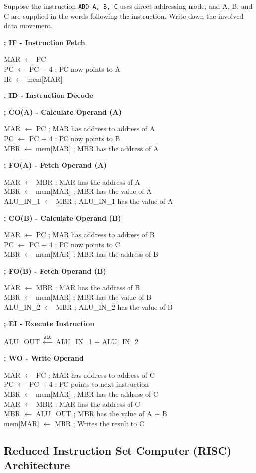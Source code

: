 \begin{example}
    Suppose the instruction \texttt{ADD A, B, C} uses direct addressing mode, and A, B, and C
    are supplied in the words following the instruction. Write down the involved data movement.

    \begin{multicols}{2}
        \ttfamily
        \textbf{; IF - Instruction Fetch} 

        MAR $\gets$ PC \\
        PC $\gets$ PC + 4 ; PC now points to A\\
        IR $\gets$ mem[MAR]

        \textbf{; ID - Instruction Decode}

        \textbf{; CO(A) - Calculate Operand (A)} 

        MAR $\gets$ PC ; MAR has address to address of A \\
        PC $\gets$ PC + 4 ; PC now points to B \\
        MBR $\gets$ mem[MAR] ; MBR has the address of A

        \textbf{; FO(A) - Fetch Operand (A)} 

        MAR $\gets$ MBR ; MAR has the address of A \\
        MBR $\gets$ mem[MAR] ; MBR has the value of A \\
        ALU\_IN\_1 $\gets$ MBR ; ALU\_IN\_1 has the value of A

        \textbf{; CO(B) - Calculate Operand (B)} 

        MAR $\gets$ PC ; MAR has address to address of B \\
        PC $\gets$ PC + 4 ; PC now points to C \\
        MBR $\gets$ mem[MAR] ; MBR has the address of B

        \textbf{; FO(B) - Fetch Operand (B)} 

        MAR $\gets$ MBR ; MAR has the address of B \\
        MBR $\gets$ mem[MAR] ; MBR has the value of B \\
        ALU\_IN\_2 $\gets$ MBR ; ALU\_IN\_2 has the value of B

        \textbf{; EI - Execute Instruction} 

        ALU\_OUT $\xleftarrow{\texttt{ALU}}$ ALU\_IN\_1 + ALU\_IN\_2

        \textbf{; WO - Write Operand} 

        MAR $\gets$ PC ; MAR has address to address of C \\
        PC $\gets$ PC + 4 ; PC points to next instruction \\
        MBR $\gets$ mem[MAR] ; MBR has the address of C \\
        MAR $\gets$ MBR ; MAR has the address of C \\
        MBR $\gets$ ALU\_OUT ; MBR has the value of A + B \\
        mem[MAR] $\gets$ MBR ; Writes the result to C
    \end{multicols}
\end{example}

\subsection{Reduced Instruction Set Computer (RISC) Architecture}